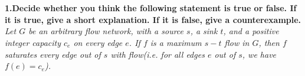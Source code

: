 
\chapter{}
\textbf{
1.Decide whether you think the following statement is true or false. If it is true, give a short explanation. If it is false, give a counterexample.
}
\emph{Let $G$ be an arbitrary flow network, with a source $s$, a sink $t$, and a positive integer capacity $c_e$ on every edge $e$. If $f$ is a maximum $s-t$ flow in $G$, then $f$ saturates every edge out of $s$ with flow(i.e. for all edges $e$ out of $s$, we have $f(e)=c_e$).}
